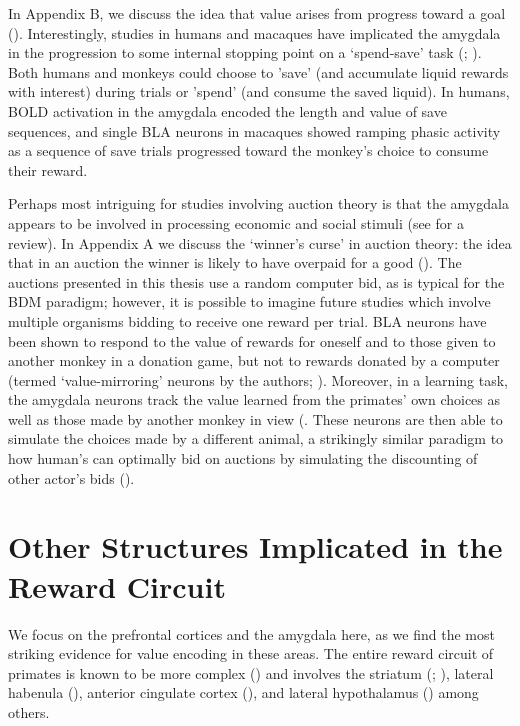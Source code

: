 In Appendix B, we discuss the idea that value arises from progress toward a goal (\cite{juechemsWhereDoesValue2019}). Interestingly, studies in humans and macaques have implicated the amygdala in the progression to some internal stopping point on a ‘spend-save’ task (\cite{grabenhorstPrimateAmygdalaNeurons2016}; \cite{zangemeisterNeuralBasisEconomic2016}). Both humans and monkeys could choose to 'save' (and accumulate liquid rewards with interest) during trials or 'spend' (and consume the saved liquid). In humans, BOLD activation in the amygdala encoded the length and value of save sequences, and single BLA neurons in macaques showed ramping phasic activity as a sequence of save trials progressed toward the monkey's choice to consume their reward.

Perhaps most intriguing for studies involving auction theory is that the amygdala appears to be involved in processing economic and social stimuli (see \cite{rutishauserPrimateAmygdalaSocial2015} for a review). In Appendix A we discuss the ‘winner’s curse’ in auction theory: the idea that in an auction the winner is likely to have overpaid for a good (\cite{capenCompetitiveBiddingHighRisk1971}). The auctions presented in this thesis use a random computer bid, as is typical for the BDM paradigm; however, it is possible to imagine future studies which involve multiple organisms bidding to receive one reward per trial. BLA neurons have been shown to respond to the value of rewards for oneself and to those given to another monkey in a donation game, but not to rewards donated by a computer (termed ‘value-mirroring’ neurons by the authors; \cite{changNeuralMechanismsSocial2015}). Moreover, in a learning task, the amygdala neurons track the value learned from the primates' own choices as well as those made by another monkey in view (\cite{grabenhorstPrimateAmygdalaNeurons2019}. These neurons are then able to simulate the choices made by a different animal, a strikingly similar paradigm to how human’s can optimally bid on auctions by simulating the discounting of other actor’s bids (\cite{wilsonCompetitiveBiddingAsymmetric1967}).

\section{Other Structures Implicated in the Reward Circuit}

We focus on the prefrontal cortices and the amygdala here, as we find the most striking evidence for value encoding in these areas. The entire reward circuit of primates is known to be more complex (\cite{haberRewardCircuitLinking2010}) and involves the striatum (\cite{samejimaRepresentationActionSpecificReward2005}; \cite{straitRewardValueComparison2014}), lateral habenula (\cite{matsumotoRepresentationNegativeMotivational2009}), anterior cingulate cortex (\cite{azabCorrelatesEconomicDecisions2018}), and lateral hypothalamus (\cite{harrisLateralHypothalamicOrexin2007}) among others.

